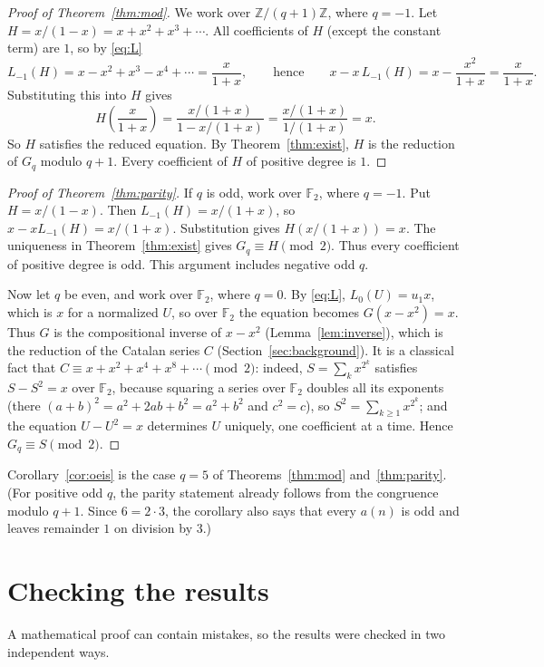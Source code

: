\documentclass[11pt,a4paper]{article}
\theoremstyle{definition}
\theoremstyle{remark}
\newcommand{\Z}{\mathbb{Z}}
\newcommand{\F}{\mathbb{F}}
\begin{document}
\begin{proof}[Proof of Theorem~\ref{thm:mod}]
We work over $\Z/(q+1)\Z$, where $q=-1$. Let $H=x/(1-x)=x+x^2+x^3+\cdots$. All coefficients of $H$ (except the
constant term) are $1$, so by \eqref{eq:L}
\[
L_{-1}(H)=x-x^2+x^3-x^4+\cdots=\frac{x}{1+x},
\qquad\text{hence}\qquad
x-x\,L_{-1}(H)=x-\frac{x^2}{1+x}=\frac{x}{1+x}.
\]
Substituting this into $H$ gives
\[
H\!\left(\frac{x}{1+x}\right)=\frac{x/(1+x)}{1-x/(1+x)}=\frac{x/(1+x)}{1/(1+x)}=x .
\]
So $H$ satisfies the reduced equation. By Theorem~\ref{thm:exist}, $H$ is the reduction of $G_q$ modulo $q+1$. Every
coefficient of $H$ of positive degree is $1$.
\end{proof}

\begin{proof}[Proof of Theorem~\ref{thm:parity}]
If $q$ is odd, work over $\F_2$, where $q=-1$. Put $H=x/(1-x)$.
Then $L_{-1}(H)=x/(1+x)$, so $x-xL_{-1}(H)=x/(1+x)$.
Substitution gives $H(x/(1+x))=x$.
The uniqueness in Theorem~\ref{thm:exist} gives $G_q\equiv H\pmod2$.
Thus every coefficient of positive degree is odd. This argument includes negative odd $q$.

Now let $q$ be even, and work over $\F_2$, where $q=0$. By \eqref{eq:L}, $L_0(U)=u_1x$, which is $x$ for a normalized
$U$, so over $\F_2$ the equation becomes $G(x-x^2)=x$. Thus $G$ is the compositional inverse of $x-x^2$
(Lemma~\ref{lem:inverse}), which is the reduction of the Catalan series $C$ (Section~\ref{sec:background}). It is a
classical fact that $C\equiv x+x^2+x^4+x^8+\cdots\pmod 2$: indeed, $S=\sum_kx^{2^k}$ satisfies $S-S^2=x$ over $\F_2$,
because squaring a series over $\F_2$ doubles all its exponents (there $(a+b)^2=a^2+2ab+b^2=a^2+b^2$ and $c^2=c$), so $S^2=\sum_{k\ge1}x^{2^k}$; and the equation
$U-U^2=x$ determines $U$ uniquely, one coefficient at a time. Hence $G_q\equiv S\pmod2$.
\end{proof}

Corollary~\ref{cor:oeis} is the case $q=5$ of Theorems~\ref{thm:mod} and~\ref{thm:parity}.
(For positive odd $q$, the parity statement already follows from the congruence modulo $q+1$. Since $6=2\cdot3$, the corollary also says that every $a(n)$ is odd and leaves remainder $1$ on division by $3$.)

\section{Checking the results}\label{sec:checks}

A mathematical proof can contain mistakes, so the results were checked in two independent ways.
\end{document}
